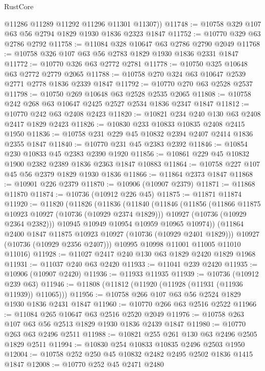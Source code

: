 \begin{lexlean}{RustCore}
\begin{coremodule}
        @11286
        @11289
        @11292
        @11296
        @11301
        @11307))
@11748 := @10758 @329 @107 @63 @56 @2794 @1829 @1930 @1836 @2323 @1847
@11752 := @10770 @329 @63 @2786 @2792
@11758 := @11084 @328 @10647 @63 @2786 @2790 @2049
@11768 := @10758 @326 @107 @63 @56 @2783 @1829 @1930 @1836 @2331 @1847
@11772 := @10770 @326 @63 @2772 @2781
@11778 := @10750 @325 @10648 @63 @2772 @2779 @2065
@11788 := @10758 @270 @324 @63 @10647 @2539 @2771 @2778 @1836 @2339 @1847
@11792 := @10770 @270 @63 @2528 @2537
@11798 := @10750 @269 @10648 @63 @2528 @2535 @2065
@11808 := @10758 @242 @268 @63 @10647 @2425 @2527 @2534 @1836 @2347 @1847
@11812 := @10770 @242 @63 @2408 @2423
@11820 := @10821 @234 @240 @130 @63 @2408 @2417 @1829 @2423
@11826 := @10830 @233 @10833 @10835 @2408 @2415 @1950
@11836 := @10758 @231 @229 @45 @10832 @2394 @2407 @2414 @1836 @2355 @1847
@11840 := @10770 @231 @45 @2383 @2392
@11846 := @10854 @230 @10833 @45 @2383 @2390 @1920
@11856 := @10861 @229 @45 @10832 @1900 @2382 @2389 @1836 @2363 @1847 @10883
@11864 := @10758 @227 @107 @45 @56 @2379 @1829 @1930 @1836
@11866 := @11864 @2373 @1847
@11868 := @10901 @226 @2379
@11870 := @10906 (@10907 @2379)
@11871 := @11868 @11870
@11874 := @10736 (@10912 @226 @45)
@11875 := @11871 @11874
@11920 := @11820
    (@11826
      (@11836
        (@11840
          (@11846
            (@11856
              (@11866 @11875 @10923 @10927 (@10736 (@10929 @2374 @1829)))
              @10927
              (@10736 (@10929 @2364 @2382)))
            @10945
            @10949
            @10954
            @10959
            @10965
            @10974))
        (@11864 @2400 @1847 @11875 @10923 @10927 (@10736 (@10929 @2401 @1829)))
        @10927
        (@10736 (@10929 @2356 @2407)))
      @10995
      @10998
      @11001
      @11005
      @11010
      @11016)
@11928 := @11027 @2417 @240 @130 @63 @1829 @2420 @1829 @1968
@11931 := @11037 @240 @63 @2420
@11933 := @11041 @239 @2420
@11935 := @10906 (@10907 @2420)
@11936 := @11933 @11935
@11939 := @10736 (@10912 @239 @63)
@11946 := @11808 (@11812 (@11920 (@11928 (@11931 (@11936 @11939)) @11065)))
@11956 := @10758 @266 @107 @63 @56 @2524 @1829 @1930 @1836 @2431 @1847
@11960 := @10770 @266 @63 @2516 @2522
@11966 := @11084 @265 @10647 @63 @2516 @2520 @2049
@11976 := @10758 @263 @107 @63 @56 @2513 @1829 @1930 @1836 @2439 @1847
@11980 := @10770 @263 @63 @2496 @2511
@11988 := @10821 @255 @261 @130 @63 @2496 @2505 @1829 @2511
@11994 := @10830 @254 @10833 @10835 @2496 @2503 @1950
@12004 := @10758 @252 @250 @45 @10832 @2482 @2495 @2502 @1836 @1415 @1847
@12008 := @10770 @252 @45 @2471 @2480

\end{coremodule}
\end{lexlean}
